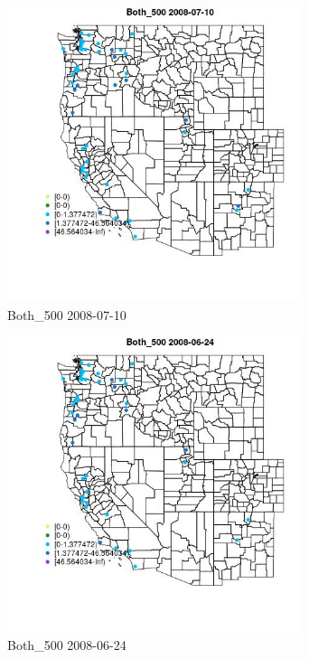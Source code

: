 \begin{figure} 
\centering  
\includegraphics[width=0.77\textwidth]{Code_Outputs/Report_ML_input_PM25_Step4_part_e_de_duplicated_aves_MapObsBoth_5002008-07-10.jpg} 
\caption{\label{fig:Report_ML_input_PM25_Step4_part_e_de_duplicated_avesMapObsBoth_5002008-07-10}Both_500 2008-07-10} 
\end{figure} 
 

\begin{figure} 
\centering  
\includegraphics[width=0.77\textwidth]{Code_Outputs/Report_ML_input_PM25_Step4_part_e_de_duplicated_aves_MapObsBoth_5002008-06-24.jpg} 
\caption{\label{fig:Report_ML_input_PM25_Step4_part_e_de_duplicated_avesMapObsBoth_5002008-06-24}Both_500 2008-06-24} 
\end{figure} 
 

